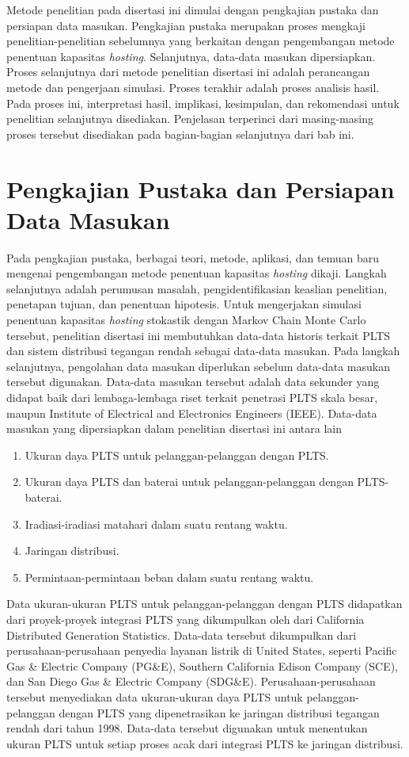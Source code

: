 Metode penelitian pada disertasi ini dimulai dengan pengkajian pustaka dan persiapan data masukan. Pengkajian pustaka merupakan proses mengkaji penelitian-penelitian sebelumnya yang berkaitan dengan pengembangan metode penentuan kapasitas \textit{\textit{hosting}}. Selanjutnya, data-data masukan dipersiapkan. Proses selanjutnya dari metode penelitian disertasi ini adalah perancangan metode dan pengerjaan simulasi. Proses terakhir adalah proses analisis hasil. Pada proses ini, interpretasi hasil, implikasi, kesimpulan, dan rekomendasi untuk penelitian selanjutnya disediakan. Penjelasan terperinci dari masing-masing proses tersebut disediakan pada bagian-bagian selanjutnya dari bab ini.

\section{Pengkajian Pustaka dan Persiapan Data Masukan}
Pada pengkajian pustaka, berbagai teori, metode, aplikasi, dan temuan baru mengenai pengembangan metode penentuan kapasitas \textit{\textit{hosting}} dikaji. Langkah selanjutnya adalah perumusan masalah, pengidentifikasian keaslian penelitian, penetapan tujuan, dan penentuan hipotesis. Untuk mengerjakan simulasi penentuan kapasitas \textit{\textit{hosting}} stokastik dengan Markov Chain Monte Carlo tersebut, penelitian disertasi ini membutuhkan data-data historis terkait PLTS dan sistem distribusi tegangan rendah sebagai data-data masukan. Pada langkah selanjutnya, pengolahan data masukan diperlukan sebelum data-data masukan tersebut digunakan. Data-data masukan tersebut adalah data sekunder yang didapat baik dari lembaga-lembaga riset terkait penetrasi PLTS skala besar, maupun Institute of Electrical and Electronics Engineers (IEEE). Data-data masukan yang dipersiapkan dalam penelitian disertasi ini antara lain
\begin{enumerate}
	\item Ukuran daya PLTS untuk pelanggan-pelanggan dengan PLTS.
	\item Ukuran daya PLTS dan baterai untuk pelanggan-pelanggan dengan PLTS-baterai.
	\item Iradiasi-iradiasi matahari dalam suatu rentang waktu.
	\item Jaringan distribusi.
	\item Permintaan-permintaan beban dalam suatu rentang waktu.
\end{enumerate}

Data ukuran-ukuran PLTS untuk pelanggan-pelanggan dengan PLTS didapatkan dari proyek-proyek integrasi PLTS yang dikumpulkan oleh dari California Distributed Generation Statistics. Data-data tersebut dikumpulkan dari perusahaan-perusahaan penyedia layanan listrik di United States, seperti Pacific Gas \& Electric Company (PG\&E), Southern California Edison Company (SCE), dan San Diego Gas \& Electric Company (SDG\&E). Perusahaan-perusahaan tersebut menyediakan data ukuran-ukuran daya PLTS untuk pelanggan-pelanggan dengan PLTS yang dipenetrasikan ke jaringan distribusi tegangan rendah dari tahun 1998. Data-data tersebut digunakan untuk menentukan ukuran PLTS untuk setiap proses acak dari integrasi PLTS ke jaringan distribusi.

